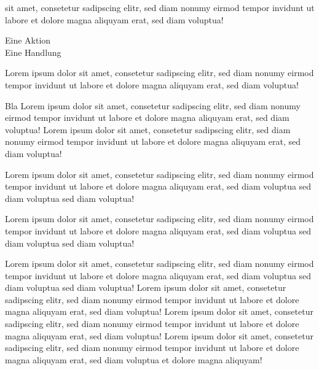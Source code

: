 \documentclass[
parindent=false,
parskip=true,
parts=true,
colortheme=wu,
styletheme=wu,
shownotess=true,
showresults=true
]{edu}
\begin{document}
 sit amet, consetetur sadipscing elitr, sed diam nonumy eirmod tempor invidunt ut labore et dolore magna aliquyam erat, sed diam voluptua!

\action Eine Aktion\\
\speech Eine Handlung


\newpage
Lorem ipsum dolor sit amet, consetetur sadipscing elitr, sed diam nonumy eirmod tempor invidunt ut labore et dolore magna aliquyam erat, sed diam voluptua! 

\begin{cols}[4]
	Bla Lorem ipsum dolor sit amet, consetetur sadipscing elitr, sed diam nonumy eirmod tempor invidunt ut labore et dolore magna aliquyam erat, sed diam voluptua! Lorem ipsum dolor sit amet, consetetur sadipscing elitr, sed diam nonumy eirmod tempor invidunt ut labore et dolore magna aliquyam erat, sed diam voluptua! 
  	
  	Lorem ipsum dolor sit amet, consetetur sadipscing elitr, sed diam nonumy eirmod tempor invidunt ut labore et dolore magna aliquyam erat, sed diam voluptua sed diam voluptua sed diam voluptua! 
    
  	
  	Lorem ipsum dolor sit amet, consetetur sadipscing elitr, sed diam nonumy eirmod tempor invidunt ut labore et dolore magna aliquyam erat, sed diam voluptua sed diam voluptua sed diam voluptua! 
    \colbreak
  	
  	Lorem ipsum dolor sit amet, consetetur sadipscing elitr, sed diam nonumy eirmod tempor invidunt ut labore et dolore magna aliquyam erat, sed diam voluptua sed diam voluptua sed diam voluptua! 
    \colbreak
    Lorem ipsum dolor sit amet, consetetur sadipscing elitr, sed diam nonumy eirmod tempor invidunt ut labore et dolore magna aliquyam erat, sed diam voluptua! 
    \colbreak
    Lorem ipsum dolor sit amet, consetetur sadipscing elitr, sed diam nonumy eirmod tempor invidunt ut labore et dolore magna aliquyam erat, sed diam voluptua! Lorem ipsum dolor sit amet, consetetur sadipscing elitr, sed diam nonumy eirmod tempor invidunt ut labore et dolore magna aliquyam erat, sed diam voluptua et dolore magna aliquyam! 
\end{cols}
\end{document}
